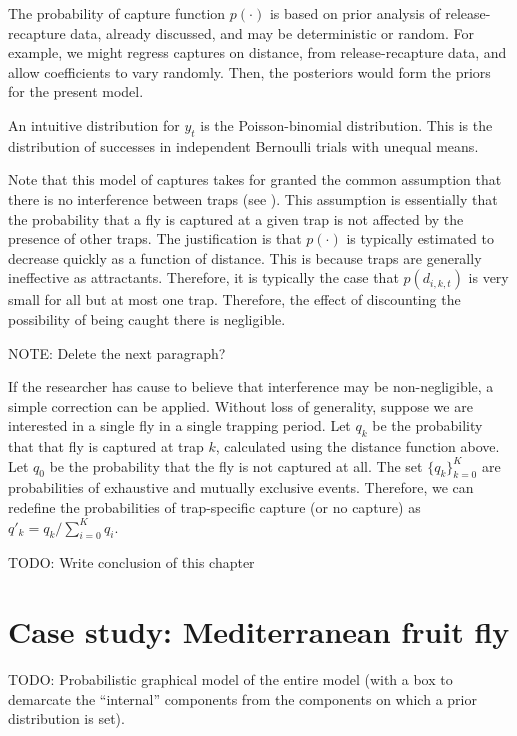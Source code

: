\documentclass[
]{book}
\begin{document}
The probability of capture function \(p(\cdot)\) is based on prior analysis of release-recapture data, already discussed, and may be deterministic or random. For example, we might regress captures on distance, from release-recapture data, and allow coefficients to vary randomly. Then, the posteriors would form the priors for the present model.

An intuitive distribution for \(y_t\) is the Poisson-binomial distribution. This is the distribution of successes in independent Bernoulli trials with unequal means.

Note that this model of captures takes for granted the common assumption that there is no interference between traps (see \citet{todocite}). This assumption is essentially that the probability that a fly is captured at a given trap is not affected by the presence of other traps. The justification is that \(p(\cdot)\) is typically estimated to decrease quickly as a function of distance. This is because traps are generally ineffective as attractants. Therefore, it is typically the case that \(p(d_{i, k, t})\) is very small for all but at most one trap. Therefore, the effect of discounting the possibility of being caught there is negligible.

NOTE: Delete the next paragraph?

If the researcher has cause to believe that interference may be non-negligible, a simple correction can be applied. Without loss of generality, suppose we are interested in a single fly in a single trapping period. Let \(q_k\) be the probability that that fly is captured at trap \(k\), calculated using the distance function above. Let \(q_0\) be the probability that the fly is not captured at all. The set \(\{q_k\}_{k=0}^K\) are probabilities of exhaustive and mutually exclusive events. Therefore, we can redefine the probabilities of trap-specific capture (or no capture) as \(q'_k = q_k / \sum_{i=0}^K q_i\).

TODO: Write conclusion of this chapter

\hypertarget{case-study-mediterranean-fruit-fly}{%
\chapter{Case study: Mediterranean fruit fly}\label{case-study-mediterranean-fruit-fly}}

TODO: Probabilistic graphical model of the entire model (with a box to demarcate the ``internal'' components from the components on which a prior distribution is set).
\end{document}
